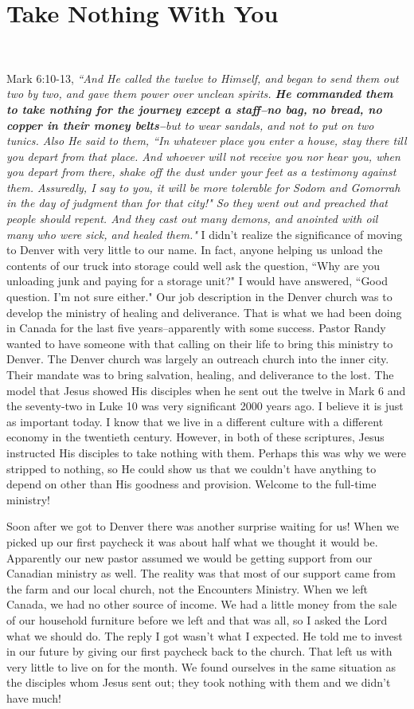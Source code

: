 \documentclass[oneside,12pt]{book}
\begin{document}
\section{Take Nothing With You}
\

Mark 6:10-13, \textit{``And He called the twelve to Himself, and began to send them out two by two, and gave them power over unclean spirits. \textbf{He commanded them to take nothing for the journey except a staff--no bag, no bread, no copper in their money belts--}but to wear sandals, and not to put on two tunics. Also He said to them, ``In whatever place you enter a house, stay there till you depart from that place. And whoever will not receive you nor hear you, when you depart from there, shake off the dust under your feet as a testimony against them. Assuredly, I say to you, it will be more tolerable for Sodom and Gomorrah in the day of judgment than for that city!" So they went out and preached that people should repent. And they cast out many demons, and anointed with oil many who were sick, and healed them."}
I didn't realize the significance of moving to Denver with very little to our name. In fact, anyone helping us unload the contents of our truck into storage could well ask the question, ``Why are you unloading junk and paying for a storage unit?" I would have answered, ``Good question. I'm not sure either." Our job description in the Denver church was to develop the ministry of healing and deliverance. That is what we had been doing in Canada for the last five years--apparently with some success. Pastor Randy wanted to have someone with that calling on their life to bring this ministry to Denver. The Denver church was largely an outreach church into the inner city. Their mandate was to bring salvation, healing, and deliverance to the lost. The model that Jesus showed His disciples when he sent out the twelve in Mark 6 and the seventy-two in Luke 10 was very significant 2000 years ago. I believe it is just as important today. I know that we live in a different culture with a different economy in the twentieth century. However, in both of these scriptures, Jesus instructed His disciples to take nothing with them. Perhaps this was why we were stripped to nothing, so He could show us that we couldn't have anything to depend on other than His goodness and provision. Welcome to the full-time ministry!

Soon after we got to Denver there was another surprise waiting for us! When we picked up our first paycheck it was about half what we thought it would be. Apparently our new pastor assumed we would be getting support from our Canadian ministry as well. The reality was that most of our support came from the farm and our local church, not the Encounters Ministry. When we left Canada, we had no other source of income. We had a little money from the sale of our household furniture before we left and that was all, so I asked the Lord what we should do. The reply I got wasn't what I expected. He told me to invest in our future by giving our first paycheck back to the church. That left us with very little to live on for the month. We found ourselves in the same situation as the disciples whom Jesus sent out; they took nothing with them and we didn't have much!
\end{document}
